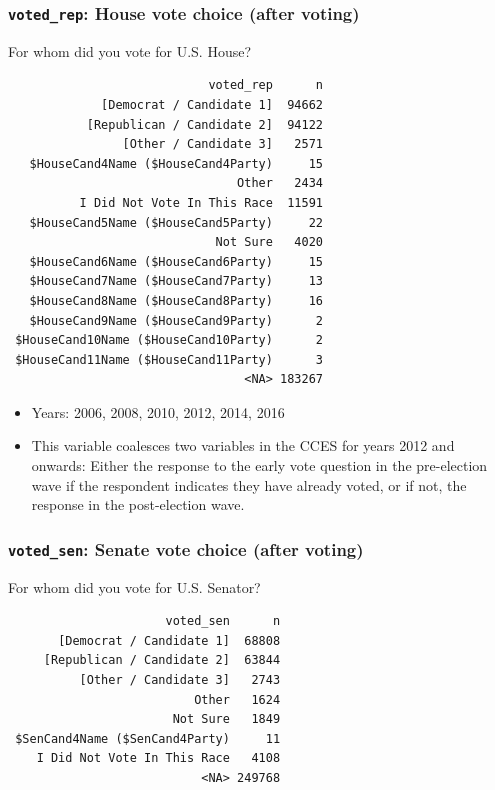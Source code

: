 \documentclass[10pt,article,oneside]{memoir}
\theoremstyle{definition}
\begin{document}
\subsubsection{\texorpdfstring{\texttt{voted\_rep}: House vote choice
(after
voting)}{voted\_rep: House vote choice (after voting)}}\label{voted_rep-house-vote-choice-after-voting}

For whom did you vote for U.S. House?

\begin{verbatim}
                            voted_rep      n
             [Democrat / Candidate 1]  94662
           [Republican / Candidate 2]  94122
                [Other / Candidate 3]   2571
   $HouseCand4Name ($HouseCand4Party)     15
                                Other   2434
          I Did Not Vote In This Race  11591
   $HouseCand5Name ($HouseCand5Party)     22
                             Not Sure   4020
   $HouseCand6Name ($HouseCand6Party)     15
   $HouseCand7Name ($HouseCand7Party)     13
   $HouseCand8Name ($HouseCand8Party)     16
   $HouseCand9Name ($HouseCand9Party)      2
 $HouseCand10Name ($HouseCand10Party)      2
 $HouseCand11Name ($HouseCand11Party)      3
                                 <NA> 183267
\end{verbatim}

\begin{itemize}
\tightlist
\item
  Years: 2006, 2008, 2010, 2012, 2014, 2016
\item
  This variable coalesces two variables in the CCES for years 2012 and
  onwards: Either the response to the early vote question in the
  pre-election wave if the respondent indicates they have already voted,
  or if not, the response in the post-election wave.
\end{itemize}

\subsubsection{\texorpdfstring{\texttt{voted\_sen}: Senate vote choice
(after
voting)}{voted\_sen: Senate vote choice (after voting)}}\label{voted_sen-senate-vote-choice-after-voting}

For whom did you vote for U.S. Senator?

\begin{verbatim}
                      voted_sen      n
       [Democrat / Candidate 1]  68808
     [Republican / Candidate 2]  63844
          [Other / Candidate 3]   2743
                          Other   1624
                       Not Sure   1849
 $SenCand4Name ($SenCand4Party)     11
    I Did Not Vote In This Race   4108
                           <NA> 249768
\end{verbatim}
\end{document}
